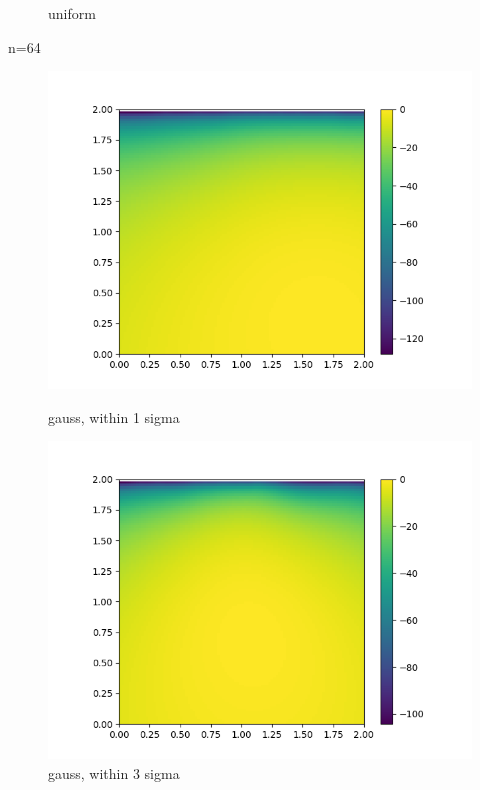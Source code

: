 \documentclass[english]{scrartcl}
\begin{document}
\begin{figure}[H]
	\caption{uniform} 
	\endminipage \hfill
\end{figure}

\par n=64
\begin{figure}[H]
	\includegraphics[width=\linewidth]{lighthouse/2d/gauss_1sigma_n=64}
	\caption{gauss, within 1 sigma}  
	\endminipage \hfill
	\includegraphics[width=\linewidth]{lighthouse/2d/gauss_3sigma_n=64}
	\caption{gauss, within 3 sigma} 
	\endminipage \hfill

\end{figure}
\end{document}
